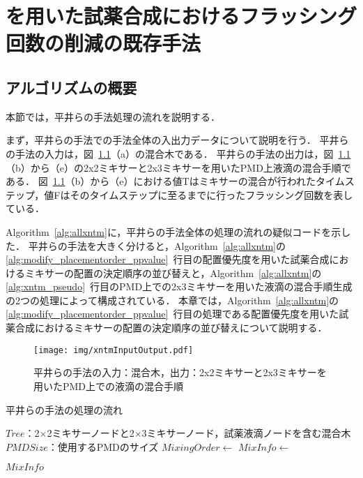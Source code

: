 \chapter{を用いた試薬合成におけるフラッシング回数の削減の既存手法}\label{sec:existing}

\section{アルゴリズムの概要}
本節では，平井らの手法処理の流れを説明する．

まず，平井らの手法での手法全体の入出力データについて説明を行う．
平井らの手法の入力は，図~\ref{fig:xntm}（a）の混合木である．
平井らの手法の出力は，図~\ref{fig:xntm}（b）から（e）の2x2ミキサーと2x3ミキサーを用いたPMD上液滴の混合手順である．
図~\ref{fig:xntm}（b）から（e）における値Tはミキサーの混合が行われたタイムステップ，値Fはそのタイムステップに至るまでに行ったフラッシング回数を表している．

Algorithm~\ref{alg:allxntm}に，平井らの手法全体の処理の流れの疑似コードを示した．
平井らの手法を大きく分けると，Algorithm~\ref{alg:allxntm}の\ref{alg:modify_placementorder_ppvalue}~行目の配置優先度を用いた試薬合成におけるミキサーの配置の決定順序の並び替えと，Algorithm~\ref{alg:allxntm}の\ref{alg:xntm_pseudo}~行目のPMD上での2x3ミキサーを用いた液滴の混合手順生成の2つの処理によって構成されている．
本章では，Algorithm~\ref{alg:allxntm}の\ref{alg:modify_placementorder_ppvalue}~行目の処理である配置優先度を用いた試薬合成におけるミキサーの配置の決定順序の並び替えについて説明する．

\begin{figure}[tbp]
 \centering\texttt{[image: img/xntmInputOutput.pdf]}
 \caption{平井らの手法の入力：混合木，出力：2x2ミキサーと2x3ミキサーを用いたPMD上での液滴の混合手順}\label{fig:xntm}
\end{figure}


\begin{algorithm}[tbp]
 \caption{平井らの手法の処理の流れ}\label{alg:allxntm}
 \begin{algorithmic}[1]
     \Require $\mathit{Tree}$：2$\times$2ミキサーノードと2$\times$3ミキサーノード，試薬液滴ノードを含む混合木
     \Require $\mathit{PMDSize}$：使用するPMDのサイズ
     \State $\mathit{MixingOrder} \gets$  \label{alg:modify_placementorder_ppvalue}
     \State $\mathit{MixInfo \gets}$  \label{alg:xntm_pseudo}

      \Return $\mathit{MixInfo}$
 \end{algorithmic}
\end{algorithm}

